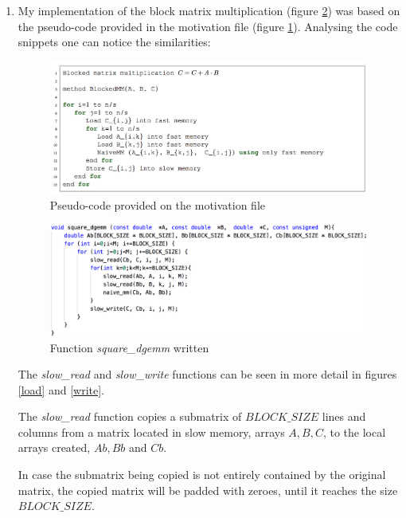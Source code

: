 \documentclass[unicode,11pt,a4paper,oneside,numbers=endperiod,openany]{scrartcl}
\begin{document}
    \begin{enumerate} %

        \item My implementation of the block matrix multiplication (figure \ref{code}) was based on the pseudo-code provided in the motivation file (figure \ref{pseudocode}).
            Analysing the code snippets one can notice the similarities:

            \begin{figure}[H]
                \includegraphics[width=\linewidth]{pseudocode}
                \caption{Pseudo-code provided on the motivation file}
                \label{pseudocode}
            \end{figure}

            \begin{figure}[H]
                \includegraphics[width=\linewidth]{code}
                \caption{Function \textit{square\_dgemm} written}
                \label{code}
            \end{figure}

            The \textit{slow\_read} and \textit{slow\_write} functions can be seen in more detail in figures \ref{load} and \ref{write}.

            The \textit{slow\_read} function copies a submatrix of $BLOCK\_SIZE$ lines and columns from a matrix located in slow memory, arrays $A, B, C$, to the local arrays created, $Ab, Bb$ and $Cb$.

            In case the submatrix being copied is not entirely contained by the original matrix, the copied matrix will be padded with zeroes, until it reaches the size $BLOCK\_SIZE$.


\end{enumerate}
\end{document}
